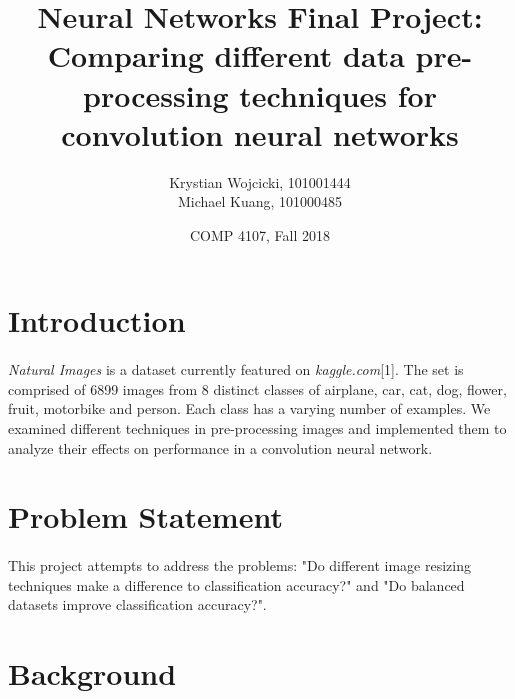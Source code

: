 \documentclass{article}
\title{Neural Networks Final Project: \\
	\large{Comparing different data pre-processing techniques for convolution neural networks}}
\author{Krystian Wojcicki, 101001444 \\ Michael Kuang, 101000485}
\date{COMP 4107, Fall 2018}
\begin{document}
\maketitle

\newcommand{\figureWidth}{0.25}
\section{Introduction}
\paragraph{}
{\em Natural Images} is a dataset currently featured on {\em kaggle.com}[1]. The set is comprised of 6899 images from 8 distinct classes of airplane, car, cat, dog, flower, fruit, motorbike and person. Each class has a varying number of examples. We examined different techniques in pre-processing images and implemented them to analyze their effects on performance in a convolution neural network. 

\section{Problem Statement}
\paragraph{}
This project attempts to address the problems: "Do different image resizing techniques make a difference to classification accuracy?" and "Do balanced datasets improve classification accuracy?".

\section{Background}
\end{document}
